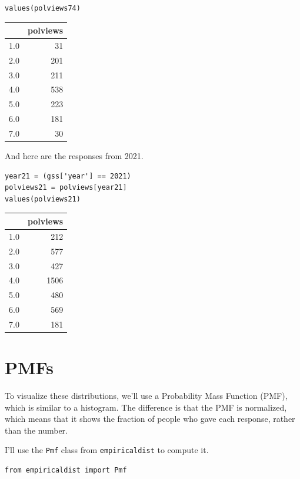 \begin{lstlisting}[]
values(polviews74)
\end{lstlisting}

\begin{tabular}{lr}
\midrule
{} &  polviews \\
\midrule
1.0 &        31 \\
2.0 &       201 \\
3.0 &       211 \\
4.0 &       538 \\
5.0 &       223 \\
6.0 &       181 \\
7.0 &        30 \\
\midrule
\end{tabular}

And here are the responses from 2021.

\begin{lstlisting}[]
year21 = (gss['year'] == 2021)
polviews21 = polviews[year21]
values(polviews21)
\end{lstlisting}

\begin{tabular}{lr}
\midrule
{} &  polviews \\
\midrule
1.0 &       212 \\
2.0 &       577 \\
3.0 &       427 \\
4.0 &      1506 \\
5.0 &       480 \\
6.0 &       569 \\
7.0 &       181 \\
\midrule
\end{tabular}

\hypertarget{pmfs}{%
\section{PMFs}\label{pmfs}}

To visualize these distributions, we'll use a Probability Mass Function
(PMF), which is similar to a histogram. The difference is that the PMF
is normalized, which means that it shows the fraction of people who gave
each response, rather than the number.

I'll use the \passthrough{\lstinline!Pmf!} class from
\passthrough{\lstinline!empiricaldist!} to compute it.

\begin{lstlisting}[]
from empiricaldist import Pmf
\end{lstlisting}

